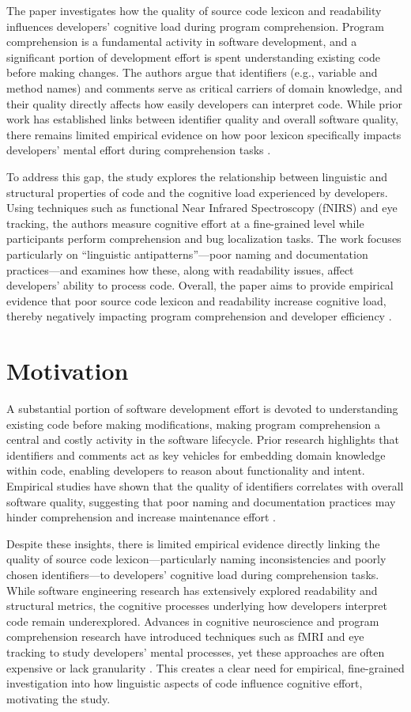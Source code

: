 The paper investigates how the quality of source code lexicon and readability influences developers' cognitive load during program comprehension. Program comprehension is a fundamental activity in software development, and a significant portion of development effort is spent understanding existing code before making changes. The authors argue that identifiers (e.g., variable and method names) and comments serve as critical carriers of domain knowledge, and their quality directly affects how easily developers can interpret code. While prior work has established links between identifier quality and overall software quality, there remains limited empirical evidence on how poor lexicon specifically impacts developers’ mental effort during comprehension tasks .

To address this gap, the study explores the relationship between linguistic and structural properties of code and the cognitive load experienced by developers. Using techniques such as functional Near Infrared Spectroscopy (fNIRS) and eye tracking, the authors measure cognitive effort at a fine-grained level while participants perform comprehension and bug localization tasks. The work focuses particularly on “linguistic antipatterns”—poor naming and documentation practices—and examines how these, along with readability issues, affect developers’ ability to process code. Overall, the paper aims to provide empirical evidence that poor source code lexicon and readability increase cognitive load, thereby negatively impacting program comprehension and developer efficiency .

\section{Motivation}

A substantial portion of software development effort is devoted to understanding existing code before making modifications, making program comprehension a central and costly activity in the software lifecycle. Prior research highlights that identifiers and comments act as key vehicles for embedding domain knowledge within code, enabling developers to reason about functionality and intent. Empirical studies have shown that the quality of identifiers correlates with overall software quality, suggesting that poor naming and documentation practices may hinder comprehension and increase maintenance effort \cite{Deissenboeck2006}.

Despite these insights, there is limited empirical evidence directly linking the quality of source code lexicon—particularly naming inconsistencies and poorly chosen identifiers—to developers’ cognitive load during comprehension tasks. While software engineering research has extensively explored readability and structural metrics, the cognitive processes underlying how developers interpret code remain underexplored. Advances in cognitive neuroscience and program comprehension research have introduced techniques such as fMRI and eye tracking to study developers’ mental processes, yet these approaches are often expensive or lack granularity \cite{Siegmund2014,Floyd2017}. This creates a clear need for empirical, fine-grained investigation into how linguistic aspects of code influence cognitive effort, motivating the study.

